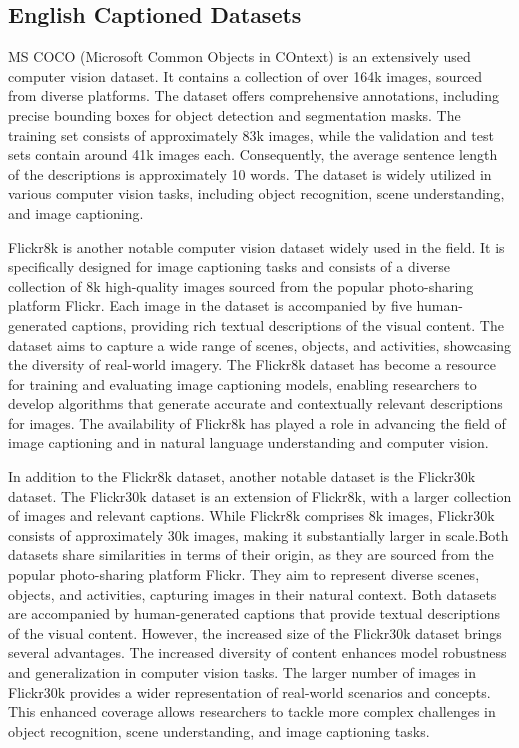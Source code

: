 \documentclass[runningheads]{llncs}
\begin{document}
\subsection{English Captioned Datasets}
MS COCO (Microsoft Common Objects in COntext) \cite{MSCOCO} is an extensively used computer vision dataset. It contains a collection of over 164k images, sourced from diverse platforms. The dataset offers comprehensive annotations, including precise bounding boxes for object detection and segmentation masks. The training set consists of approximately 83k images, while the validation and test sets contain around 41k images each. Consequently, the average sentence length of the descriptions is approximately 10 words. The dataset is widely utilized in various computer vision tasks, including object recognition, scene understanding, and image captioning.

Flickr8k \cite{Flickr8k} is another notable computer vision dataset widely used in the field. It is specifically designed for image captioning tasks and consists of a diverse collection of 8k high-quality images sourced from the popular photo-sharing platform Flickr. Each image in the dataset is accompanied by five human-generated captions, providing rich textual descriptions of the visual content. The dataset aims to capture a wide range of scenes, objects, and activities, showcasing the diversity of real-world imagery. The Flickr8k dataset has become a resource for training and evaluating image captioning models, enabling researchers to develop algorithms that generate accurate and contextually relevant descriptions for images. The availability of Flickr8k has played a role in advancing the field of image captioning and in natural language understanding and computer vision.

In addition to the Flickr8k dataset, another notable dataset is the Flickr30k dataset. The Flickr30k \cite{Flickr30k} dataset is an extension of Flickr8k, with a larger collection of images and relevant captions. While Flickr8k comprises 8k images, Flickr30k consists of approximately 30k images, making it substantially larger in scale.Both datasets share similarities in terms of their origin, as they are sourced from the popular photo-sharing platform Flickr. They aim to represent diverse scenes, objects, and activities, capturing images in their natural context. Both datasets are accompanied by human-generated captions that provide textual descriptions of the visual content. However, the increased size of the Flickr30k dataset brings several advantages. The increased diversity of content enhances model robustness and generalization in computer vision tasks. The larger number of images in Flickr30k provides a wider representation of real-world scenarios and concepts. This enhanced coverage allows researchers to tackle more complex challenges in object recognition, scene understanding, and image captioning tasks. 
\end{document}
